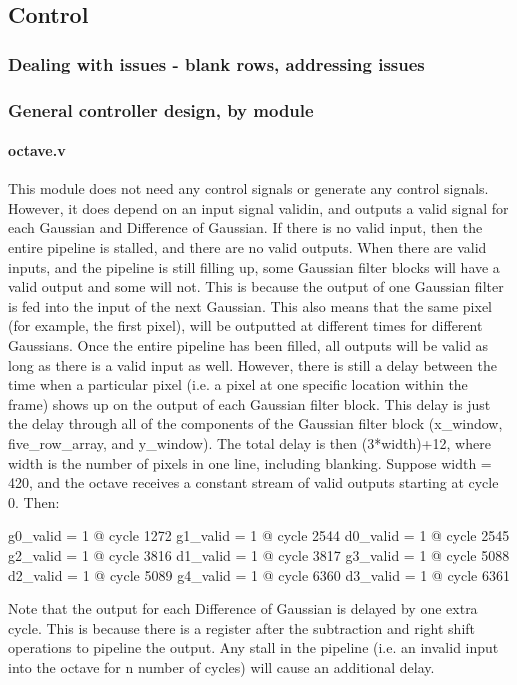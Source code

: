\documentclass[12pt]{article}
\begin{document}
\subsection{Control}

\subsubsection{Dealing with issues - blank rows, addressing issues}

\subsubsection{General controller design, by module}

\paragraph{octave.v}
This module does not need any control signals or generate any control signals. 
However, it does depend on an input signal validin, and outputs a valid signal 
for each Gaussian and Difference of Gaussian. If there is no valid input, then 
the entire pipeline is stalled, and there are no valid outputs. When there are 
valid inputs, and the pipeline is still filling up, some Gaussian filter blocks 
will have a valid output and some will not. This is because the output of one 
Gaussian filter is fed into the input of the next Gaussian. This also means that 
the same pixel (for example, the first pixel), will be outputted at different 
times for different Gaussians. Once the entire pipeline has been filled, all 
outputs will be valid as long as there is a valid input as well. However, there 
is still a delay between the time when a particular pixel (i.e. a pixel at one 
specific location within the frame) shows up on the output of each Gaussian 
filter block. This delay is just the delay through all of the components of the 
Gaussian filter block (x\_window, five\_row\_array, and y\_window). The total delay 
is then (3*width)+12, where width is the number of pixels in one line, including 
blanking. Suppose width = 420, and the octave receives a constant stream of 
valid outputs starting at cycle 0. Then:

g0\_valid = 1 @ cycle 1272
g1\_valid = 1 @ cycle 2544
d0\_valid = 1 @ cycle 2545
g2\_valid = 1 @ cycle 3816
d1\_valid = 1 @ cycle 3817
g3\_valid = 1 @ cycle 5088
d2\_valid = 1 @ cycle 5089
g4\_valid = 1 @ cycle 6360
d3\_valid = 1 @ cycle 6361

Note that the output for each Difference of Gaussian is delayed by one extra cycle. This is because there is a register after the subtraction and right shift operations to pipeline the output. Any stall in the pipeline (i.e. an invalid input into the octave for n number of cycles) will cause an additional delay.
\end{document}
